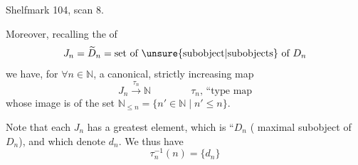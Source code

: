 Shelfmark 104, scan 8.

Moreover, recalling the  of
\[
 J_n=\widetilde D_n=\text{set of \unsure{subobject|subobjects} of }D_n
\]
we have, for \(\forall n\in\mathbb N\), a canonical, strictly increasing map
\[
 J_n\xrightarrow{\tau_n}\mathbb N \qquad\qquad
 \text{\(\tau_n\), ``type map}
\]
whose image is   of the set
 \(\mathbb N_{\leq n}=\{n'\in\mathbb N\mid n'\leq n\}\).

Note that each \(J_n\) has a greatest element, which is ``\(D_n\) (  maximal subobject of \(D_n\)), and which  denote \(d_n\). We thus have 
\[
 \tau_n^{-1}(n)=\{d_n\}
\]


